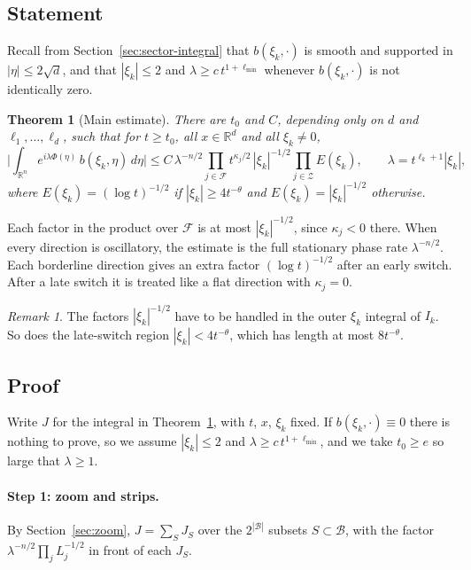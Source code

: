 \documentclass[11pt]{article}
\newtheorem{theorem}{Theorem}
\theoremstyle{remark}
\newtheorem*{remark}{Remark}
\newcommand{\R}{\mathbb{R}}
\begin{document}
\subsection{Statement}

Recall from Section~\ref{sec:sector-integral} that $b(\xi_k,\cdot)$ is smooth and
supported in $|\eta|\le2\sqrt d$, and that $|\xi_k|\le2$ and
$\lambda\ge c\,t^{1+\ell_{\min}}$ whenever $b(\xi_k,\cdot)$ is not identically zero.

\begin{theorem}[Main estimate]\label{thm:main}
	There are $t_0$ and $C$, depending only on $d$ and $\ell_1,\dots,\ell_d$, such
	that for $t\ge t_0$, all $x\in\R^d$ and all $\xi_k\ne0$,
	\[
	\Big|\int_{\R^n}e^{i\lambda\Phi(\eta)}\,b(\xi_k,\eta)\,d\eta\Big|
	\le C\,\lambda^{-n/2}\prod_{j\in\mathcal F}t^{\kappa_j/2}\,|\xi_k|^{-1/2}
	\prod_{j\in\mathcal Z}E(\xi_k),
	\qquad\lambda=t^{\ell_k+1}|\xi_k| ,
	\]
	where $E(\xi_k)=(\log t)^{-1/2}$ if $|\xi_k|\ge4t^{-\theta}$ and
	$E(\xi_k)=|\xi_k|^{-1/2}$ otherwise.
\end{theorem}

Each factor in the product over $\mathcal F$ is at most $|\xi_k|^{-1/2}$, since
$\kappa_j<0$ there. When every direction is oscillatory, the estimate is the full
stationary phase rate $\lambda^{-n/2}$. Each borderline direction gives an extra
factor $(\log t)^{-1/2}$ after an early switch. After a late switch it is treated
like a flat direction with $\kappa_j=0$.

\begin{remark}
	The factors $|\xi_k|^{-1/2}$ have to be handled in the outer $\xi_k$ integral of
	$I_k$. So does the late-switch region $|\xi_k|<4t^{-\theta}$, which has length at
	most $8t^{-\theta}$.
\end{remark}

\subsection{Proof}

Write $J$ for the integral in Theorem~\ref{thm:main}, with $t$, $x$, $\xi_k$ fixed. If
$b(\xi_k,\cdot)\equiv0$ there is nothing to prove, so we assume $|\xi_k|\le2$ and
$\lambda\ge c\,t^{1+\ell_{\min}}$, and we take $t_0\ge e$ so large that
$\lambda\ge1$.

\paragraph{Step 1: zoom and strips.} By Section~\ref{sec:zoom},
$J=\sum_SJ_S$ over the $2^{|\mathcal B|}$ subsets $S\subset\mathcal B$, with the
factor $\lambda^{-n/2}\prod_jL_j^{-1/2}$ in front of each $J_S$.
\end{document}
